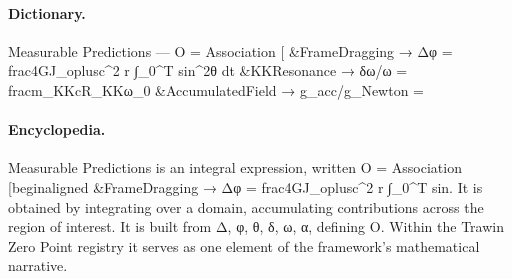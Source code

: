 \paragraph{Dictionary.}
Measurable Predictions — O = Association [ \&FrameDragging → Δφ = frac4GJ\_oplusc\textasciicircum{}2 r ∫\_0\textasciicircum{}T sin\textasciicircum{}2θ dt \&KKResonance → δω/ω = fracm\_KKcR\_KKω\_0 \&AccumulatedField → g\_acc/g\_Newton =

\paragraph{Encyclopedia.}
Measurable Predictions is an integral expression, written O = Association [beginaligned \&FrameDragging → Δφ = frac4GJ\_oplusc\textasciicircum{}2 r ∫\_0\textasciicircum{}T sin. It is obtained by integrating over a domain, accumulating contributions across the region of interest. It is built from Δ, φ, θ, δ, ω, α, defining O. Within the Trawin Zero Point registry it serves as one element of the framework's mathematical narrative.

